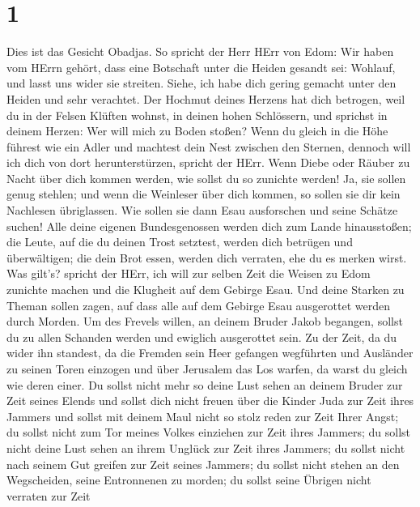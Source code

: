 \hypertarget{section}{%
\section{1}\label{section}}

 Dies ist das Gesicht Obadjas. So spricht der Herr HErr von
Edom: Wir haben vom HErrn gehört, dass eine Botschaft unter die Heiden
gesandt sei: Wohlauf, und lasst uns wider sie streiten. 
Siehe, ich habe dich gering gemacht unter den Heiden und sehr verachtet.
 Der Hochmut deines Herzens hat dich betrogen, weil du in
der Felsen Klüften wohnst, in deinen hohen Schlössern, und sprichst in
deinem Herzen: Wer will mich zu Boden stoßen?  Wenn du
gleich in die Höhe führest wie ein Adler und machtest dein Nest zwischen
den Sternen, dennoch will ich dich von dort herunterstürzen, spricht der
HErr.  Wenn Diebe oder Räuber zu Nacht über dich kommen
werden, wie sollst du so zunichte werden! Ja, sie sollen genug stehlen;
und wenn die Weinleser über dich kommen, so sollen sie dir kein
Nachlesen übriglassen.  Wie sollen sie dann Esau ausforschen
und seine Schätze suchen!  Alle deine eigenen Bundesgenossen
werden dich zum Lande hinausstoßen; die Leute, auf die du deinen Trost
setztest, werden dich betrügen und überwältigen; die dein Brot essen,
werden dich verraten, ehe du es merken wirst.  Was gilt's?
spricht der HErr, ich will zur selben Zeit die Weisen zu Edom zunichte
machen und die Klugheit auf dem Gebirge Esau.  Und deine
Starken zu Theman sollen zagen, auf dass alle auf dem Gebirge Esau
ausgerottet werden durch Morden.  Um des Frevels willen, an
deinem Bruder Jakob begangen, sollst du zu allen Schanden werden und
ewiglich ausgerottet sein.  Zu der Zeit, da du wider ihn
standest, da die Fremden sein Heer gefangen wegführten und Ausländer zu
seinen Toren einzogen und über Jerusalem das Los warfen, da warst du
gleich wie deren einer.  Du sollst nicht mehr so deine Lust
sehen an deinem Bruder zur Zeit seines Elends und sollst dich nicht
freuen über die Kinder Juda zur Zeit ihres Jammers und sollst mit deinem
Maul nicht so stolz reden zur Zeit Ihrer Angst;  du sollst
nicht zum Tor meines Volkes einziehen zur Zeit ihres Jammers; du sollst
nicht deine Lust sehen an ihrem Unglück zur Zeit ihres Jammers; du
sollst nicht nach seinem Gut greifen zur Zeit seines Jammers;
 du sollst nicht stehen an den Wegscheiden, seine
Entronnenen zu morden; du sollst seine Übrigen nicht verraten zur Zeit
